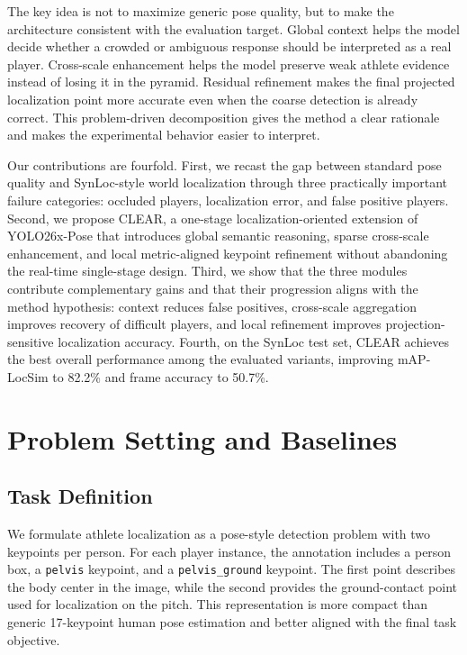 \documentclass[runningheads]{llncs}
\begin{document}
The key idea is not to maximize generic pose quality, but to make the architecture consistent with the evaluation target. Global context helps the model decide whether a crowded or ambiguous response should be interpreted as a real player. Cross-scale enhancement helps the model preserve weak athlete evidence instead of losing it in the pyramid. Residual refinement makes the final projected localization point more accurate even when the coarse detection is already correct. This problem-driven decomposition gives the method a clear rationale and makes the experimental behavior easier to interpret.

Our contributions are fourfold. First, we recast the gap between standard pose quality and SynLoc-style world localization through three practically important failure categories: occluded players, localization error, and false positive players. Second, we propose CLEAR, a one-stage localization-oriented extension of YOLO26x-Pose that introduces global semantic reasoning, sparse cross-scale enhancement, and local metric-aligned keypoint refinement without abandoning the real-time single-stage design. Third, we show that the three modules contribute complementary gains and that their progression aligns with the method hypothesis: context reduces false positives, cross-scale aggregation improves recovery of difficult players, and local refinement improves projection-sensitive localization accuracy. Fourth, on the SynLoc test set, CLEAR achieves the best overall performance among the evaluated variants, improving mAP-LocSim to 82.2\% and frame accuracy to 50.7\%.



\section{Problem Setting and Baselines}
\label{sec:problem-baseline}

\subsection{Task Definition}
\label{sec:task-definition}

We formulate athlete localization as a pose-style detection problem with two keypoints per person. For each player instance, the annotation includes a person box, a \texttt{pelvis} keypoint, and a \texttt{pelvis\_ground} keypoint. The first point describes the body center in the image, while the second provides the ground-contact point used for localization on the pitch. This representation is more compact than generic 17-keypoint human pose estimation and better aligned with the final task objective.
\end{document}
